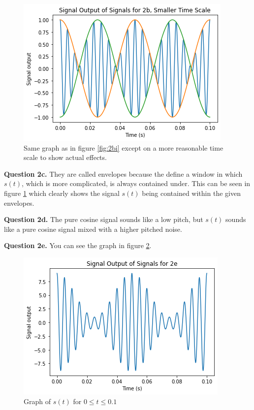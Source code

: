 \documentclass[letterpaper, reqno,11pt]{article}
\begin{document}
\begin{figure}[htbp]
\centering
\includegraphics[width=\textwidth]{images/2bii}
\caption{Same graph as in figure \ref{fig:2bi} except on a more reasonable time scale to show actual effects. }
\label{fig:2bii}
\end{figure}

{\noindent\bf Question 2c.} They are called envelopes because the define a window in which $s(t)$, which is more complicated, is always contained under. This can be seen in figure \ref{fig:2bii} which clearly shows the signal $s(t)$ being contained within the given envelopes. 

{\noindent\bf Question 2d.} The pure cosine signal sounds like a low pitch, but $s(t)$ sounds like a pure cosine signal mixed with a higher pitched noise. 

{\noindent\bf Question 2e.} You can see the graph in figure \ref{fig:2e}. 

\begin{figure}[htbp]
\centering
\includegraphics[width=\textwidth]{2e}
\caption{Graph of $s(t)$ for $0\leq t\leq 0.1$}
\label{fig:2e}
\end{figure}
\end{document}
